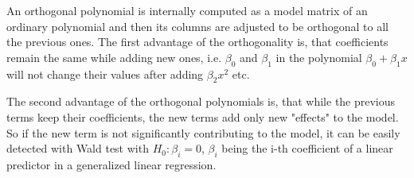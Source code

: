 An orthogonal polynomial is internally computed as a model matrix of an ordinary polynomial and then its
columns are adjusted to be orthogonal to all the previous ones. The first advantage of the orthogonality 
is, that coefficients remain the same while adding new ones, i.e. $\beta_0$ and $\beta_1$ in the 
polynomial $\beta_0 + \beta_1x$ will not change their values after adding $\beta_2x^2$ etc.











The second advantage of the orthogonal polynomials is, that while the previous terms keep their 
coefficients, the new terms add only new "effects" to the model. So if the new term is not significantly
contributing to the model, it can be easily detected with Wald test with $H_0: \beta_i = 0$, $\beta_i$ being the i-th coefficient of a linear predictor in a generalized linear regression.

